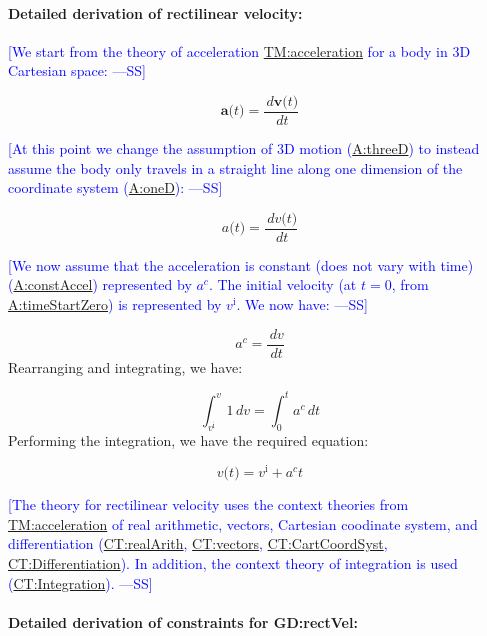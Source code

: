 \documentclass[12pt]{article}
\newcommand{\authornote}[3]{\textcolor{#1}{[#3 ---#2]}}
\newcommand{\authornote}[3]{}
\newcommand{\wss}[1]{\authornote{blue}{SS}{#1}}
\begin{document}
\paragraph{Detailed derivation of rectilinear velocity:}
\label{GD:rectVelDeriv}
\wss{We start from the theory of acceleration
\hyperref[TM:acceleration]{TM:acceleration} for a body in 3D Cartesian space:}

$$\symbf{a}\text{(}t\text{)}=\frac{\,d\symbf{v}\text{(}t\text{)}}{\,dt}$$

\wss{At this point we change the assumption of 3D motion
(\hyperref[threeD]{A:threeD}) to instead assume the body only travels in a
straight line along one dimension of the coordinate system
(\hyperref[oneD]{A:oneD}):}

$${a}\text{(}t\text{)}=\frac{\,d{v}\text{(}t\text{)}}{\,dt}$$

\wss{We now assume that the acceleration is constant (does not vary with time)
(\hyperref[constAccel]{A:constAccel}) represented by ${a^{c}}$. The initial
velocity (at $t=0$, from \hyperref[timeStartZero]{A:timeStartZero}) is
represented by ${v^{\text{i}}}$. We now have:}

\begin{displaymath}
{a^{c}}=\frac{\,dv}{\,dt}
\end{displaymath}
Rearranging and integrating, we have:

\begin{displaymath}
\int_{{v^{\text{i}}}}^{v}{1}\,dv=\int_{0}^{t}{{a^{c}}}\,dt
\end{displaymath}
Performing the integration, we have the required equation:

\begin{displaymath}
v\text{(}t\text{)}={v^{\text{i}}}+{a^{c}} t
\end{displaymath}

\wss{The theory for rectilinear velocity uses the context theories from
\hyperref[TM:acceleration]{TM:acceleration} of real arithmetic, vectors,
Cartesian coodinate system, and differentiation
(\hyperref[CT:realArith]{CT:realArith}, \hyperref[CT:vectors]{CT:vectors},
\hyperref[CT:CartCoordSyst]{CT:CartCoordSyst},
\hyperref[CT:Differentiation]{CT:Differentiation}).  In addition, the context
theory of integration is used (\hyperref[CT:Integration]{CT:Integration}).}

\paragraph{Detailed derivation of constraints for GD:rectVel:}
\end{document}
